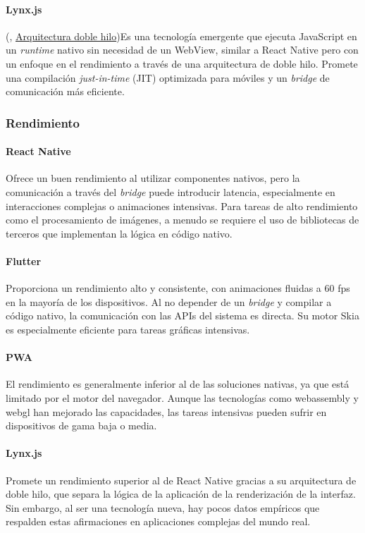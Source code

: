 \paragraph{Lynx.js}
(\cite{lynx-documentation}, \href{https://lynxjs.org/react/lifecycle.html#dual-thread-architecture-design}{Arquitectura doble hilo})Es una tecnología emergente que ejecuta JavaScript en un \textit{runtime} nativo sin necesidad de un WebView, similar a React Native pero con un enfoque en el rendimiento a través de una arquitectura de doble hilo. Promete una compilación \textit{just-in-time} (JIT) optimizada para móviles y un \textit{bridge} de comunicación más eficiente.

\subsubsection{Rendimiento}

\paragraph{React Native}
Ofrece un buen rendimiento al utilizar componentes nativos, pero la comunicación a través del \textit{bridge} puede introducir latencia, especialmente en interacciones complejas o animaciones intensivas. Para tareas de alto rendimiento como el procesamiento de imágenes, a menudo se requiere el uso de bibliotecas de terceros que implementan la lógica en código nativo.

\paragraph{Flutter}
Proporciona un rendimiento alto y consistente, con animaciones fluidas a 60 \acrshort{fps} en la mayoría de los dispositivos. Al no depender de un \textit{bridge} y compilar a código nativo, la comunicación con las APIs del sistema es directa. Su motor Skia es especialmente eficiente para tareas gráficas intensivas.

\paragraph{PWA}
El rendimiento es generalmente inferior al de las soluciones nativas, ya que está limitado por el motor del navegador. Aunque las tecnologías como \gls{webassembly} y \gls{webgl} han mejorado las capacidades, las tareas intensivas pueden sufrir en dispositivos de gama baja o media.

\paragraph{Lynx.js}
Promete un rendimiento superior al de React Native gracias a su arquitectura de doble hilo, que separa la lógica de la aplicación de la renderización de la interfaz. Sin embargo, al ser una tecnología nueva, hay pocos datos empíricos que respalden estas afirmaciones en aplicaciones complejas del mundo real.

